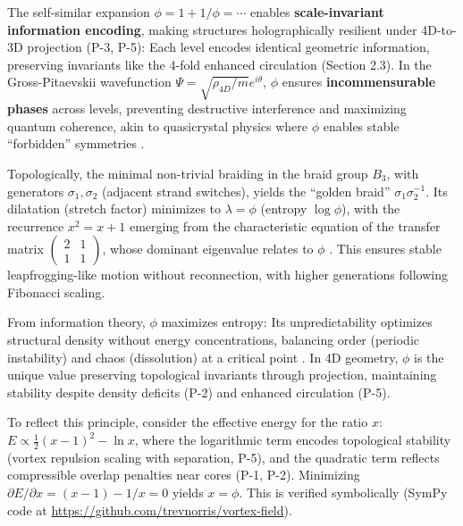 The self-similar expansion $\phi = 1 + 1/\phi = \cdots$ enables \textbf{scale-invariant information encoding}, making structures holographically resilient under 4D-to-3D projection (P-3, P-5): Each level encodes identical geometric information, preserving invariants like the 4-fold enhanced circulation (Section 2.3). In the Gross-Pitaevskii wavefunction $\Psi = \sqrt{\rho_{4D}/m} e^{i \theta}$, $\phi$ ensures \textbf{incommensurable phases} across levels, preventing destructive interference and maximizing quantum coherence, akin to quasicrystal physics where $\phi$ enables stable ``forbidden'' symmetries \cite{quasicrystals, entropy_encoding}.

Topologically, the minimal non-trivial braiding in the braid group $B_3$, with generators $\sigma_1, \sigma_2$ (adjacent strand switches), yields the ``golden braid'' $\sigma_1 \sigma_2^{-1}$. Its dilatation (stretch factor) minimizes to $\lambda = \phi$ (entropy $\log \phi$), with the recurrence $x^2 = x + 1$ emerging from the characteristic equation of the transfer matrix $\begin{pmatrix} 2 & 1 \\ 1 & 1 \end{pmatrix}$, whose dominant eigenvalue relates to $\phi$ \cite{braid_topology}. This ensures stable leapfrogging-like motion without reconnection, with higher generations following Fibonacci scaling.

From information theory, $\phi$ maximizes entropy: Its unpredictability optimizes structural density without energy concentrations, balancing order (periodic instability) and chaos (dissolution) at a critical point \cite{quasicrystals}. In 4D geometry, $\phi$ is the unique value preserving topological invariants through projection, maintaining stability despite density deficits (P-2) and enhanced circulation (P-5).

To reflect this principle, consider the effective energy for the ratio $x$: $E \propto \frac{1}{2} (x - 1)^2 - \ln x$, where the logarithmic term encodes topological stability (vortex repulsion scaling with separation, P-5), and the quadratic term reflects compressible overlap penalties near cores (P-1, P-2). Minimizing $\partial E / \partial x = (x - 1) - 1/x = 0$ yields $x = \phi$. This is verified symbolically (SymPy code at \url{https://github.com/trevnorris/vortex-field}).


